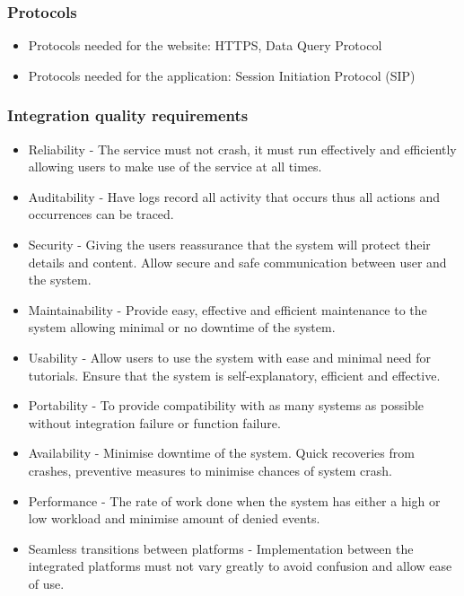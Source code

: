 \documentclass[11pt]{article}
\begin{document}
		\subsubsection{Protocols}
			\begin{itemize}
				\item Protocols needed for the website: HTTPS, Data Query Protocol
				\item Protocols needed for the application: Session Initiation Protocol (SIP)
			\end{itemize}
		\subsubsection{Integration quality requirements}
			\begin{itemize}
				\item Reliability - The service must not crash, it must run effectively and efficiently allowing users to make use of the service at all times.
				\item Auditability - Have logs record all activity that occurs thus all actions and occurrences can be traced.
				\item Security - Giving the users reassurance that the system will protect their details and content. Allow secure and safe communication between user and the system.
				\item Maintainability - Provide easy, effective and efficient maintenance to the system allowing minimal or no downtime of the system.
				\item Usability - Allow users to use the system with ease and minimal need for tutorials. Ensure that the system is self-explanatory, efficient and effective.
				\item Portability - To provide compatibility with as many systems as possible without integration failure or function failure.
				\item Availability - Minimise downtime of the system. Quick recoveries from crashes, preventive measures to minimise chances of system crash.
				\item Performance - The rate of work done when the system has either a high or low workload and minimise amount of denied events.
				\item Seamless transitions between platforms - Implementation between the integrated platforms must not vary greatly to avoid confusion and allow ease of use.
			\end{itemize}
\end{document}
